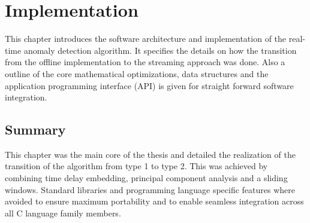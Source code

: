 \chapter{Implementation}
This chapter introduces the software architecture and implementation of the real-time anomaly detection algorithm. It specifies the details on how the transition from the offline implementation to the streaming approach was done. Also a outline of the core mathematical optimizations, data structures and the application programming interface (API) is given for straight forward software integration. 





\section{Summary}
This chapter was the main core of the thesis and detailed the realization of the transition of the algorithm from type 1 to type 2. This was achieved by combining time delay embedding, principal component analysis and a sliding windows. Standard libraries and programming language specific features where avoided to ensure maximum portability and to enable seamless integration across all C language family members.
